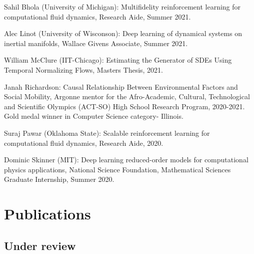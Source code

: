 \documentclass[letterpaper]{article}
\renewenvironment{itemize}{
  \begin{list}{}{
    \setlength{\leftmargin}{1.5em}
  }
}{
  \end{list}
}
\begin{document}
\begin{itemize}

  \item Sahil Bhola (University of Michigan): Multifidelity reinforcement learning for computational fluid dynamics, Research Aide, Summer 2021.

  \item Alec Linot (University of Wisconson): Deep learning of dynamical systems on inertial manifolds, Wallace Givens Associate, Summer 2021.

  \item William McClure (IIT-Chicago): Estimating the Generator of SDEs Using Temporal Normalizing Flows, Masters Thesis, 2021. 

  \item Janah Richardson: Causal Relationship Between Environmental Factors and Social Mobility, Argonne mentor for the Afro-Academic, Cultural, Technological and Scientific Olympics (ACT-SO) High School Research Program, 2020-2021. Gold medal winner in Computer Science category- Illinois.

  \item Suraj Pawar (Oklahoma State): Scalable reinforcement learning for computational fluid dynamics, Research Aide, 2020.

  \item Dominic Skinner (MIT): Deep learning reduced-order models for computational physics applications, National Science Foundation, Mathematical Sciences Graduate Internship, Summer 2020.

\end{itemize}


\section*{Publications}

\subsection*{Under review}
\end{document}
